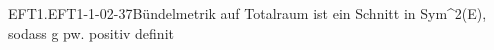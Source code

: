 \begin{DEF}{EFT1.EFT1-1-02-37}{Bündelmetrik auf Totalraum ist ein Schnitt in Sym^2(E), sodass g pw. positiv definit }

\end{DEF}
